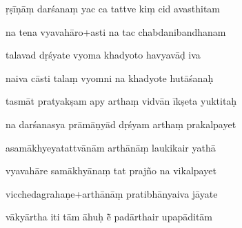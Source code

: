 \documentclass[article,12pt,a4paper]{memoir}%
\newcounter{parCount}
\begin{document}
	  
	  \pstart {} ṛṣīṇāṃ darśanaṃ yac ca tattve kiṃ cid avasthitam 
	{}
	\pend%
      

	  
	  \pstart \leavevmode%
	na tena vyavahāro+asti na tac chabdanibandhanam 
	{}
	\pend%
      

	  
	  \pstart {} talavad dṛśyate vyoma khadyoto havyavāḍ iva 
	{}
	\pend%
      

	  
	  \pstart \leavevmode%
	naiva cāsti talaṃ vyomni na khadyote hutāśanaḥ 
	{}
	\pend%
      

	  
	  \pstart {} tasmāt pratyakṣam apy arthaṃ vidvān īkṣeta yuktitaḥ 
	{}
	\pend%
      

	  
	  \pstart \leavevmode%
	na darśanasya prāmāṇyād dṛśyam arthaṃ prakalpayet 
	{}
	\pend%
      

	  
	  \pstart {} asamākhyeyatattvānām arthānāṃ laukikair yathā 
	{}
	\pend%
      

	  
	  \pstart \leavevmode%
	vyavahāre samākhyānaṃ tat prajño na vikalpayet 
	{}
	\pend%
      

	  
	  \pstart {} vicchedagrahaṇe+arthānāṃ pratibhānyaiva jāyate 
	{}
	\pend%
      

	  
	  \pstart \leavevmode%
	vākyārtha iti tām āhuḥ ē̃ padārthair upapāditām 
	{}
	\pend%
      
\end{document}
